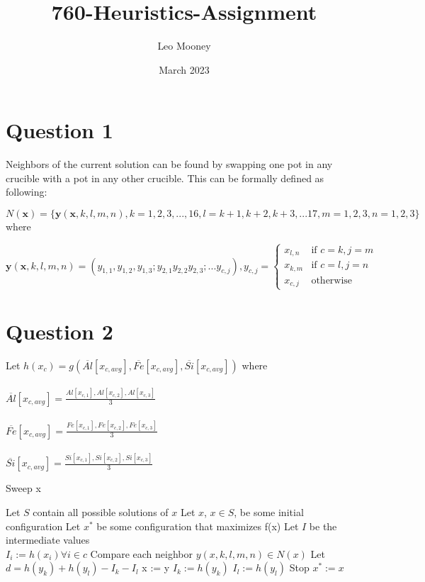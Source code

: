 \documentclass{article}
\title{760-Heuristics-Assignment}
\author{Leo Mooney}
\date{March 2023}
\begin{document}
\maketitle

\section{Question 1}
Neighbors of the current solution can be found by swapping one pot in
any crucible with a pot in any other crucible.
This can be formally defined as following:

$N(\mathbf{x}) = \{\mathbf{y}(\mathbf{x}, k, l, m, n), k=1,2,3,...,16, 
l=k+1,k+2,k+3,...17, m=1,2,3, n=1,2,3\}$ where

$$\mathbf{y}(\mathbf{x},k,l,m,n)=(y_{1, 1},y_{1, 2},y_{1, 3};
y_{2, 1}y_{2, 2}y_{2, 3};...y_{c, j}),y_{c,j}=
\begin{cases}
    x_{l, n} & \text{if } c=k,j=m \\
    x_{k, m} & \text{if } c=l,j=n \\
    x_{c,j} & \text{otherwise}
\end{cases}$$

\clearpage
\section{Question 2}
Let $h(x_c) = g(\overline{Al}[x_{c,avg}], \overline{Fe}[x_{c,avg}], \overline{Si}[x_{c, avg}])$ where \\\\
$\overline{Al}[x_{c,avg}] = \displaystyle\frac{Al[x_{c,1}], Al[x_{c,2}], Al[x_{c,3}]}{3}$\\\\
$\overline{Fe}[x_{c,avg}] = \displaystyle\frac{Fe[x_{c,1}], Fe[x_{c,2}], Fe[x_{c,3}]}{3}$\\\\
$\overline{Si}[x_{c,avg}] = \displaystyle\frac{Si[x_{c,1}], Si[x_{c,2}], Si[x_{c,3}]}{3}$

\begin{algorithm}
\caption{Sweep x}
\begin{algorithmic}
  \STATE Let $S$ contain all possible solutions of $x$
  \STATE Let $x$, $x \in S$, be some initial configuration
  \STATE Let $x^*$ be some configuration that maximizes f(x)
  \STATE Let $I$ be the intermediate values\\
  \STATE $I_i := h(x_i) \forall i \in c$ 
    \STATE Compare each neighbor $y(x, k, l, m, n) \in  N(x)$
    \STATE Let $d = h(y_k) + h(y_l) - I_k - I_l$
      \STATE x := y
      \STATE $I_k := h(y_k)$ 
      \STATE $I_l := h(y_l)$ 
      \STATE Stop
    \ENDIF
  \ENDWHILE
  \STATE $x^* := x$
\end{algorithmic}
\end{algorithm}
\end{document}
